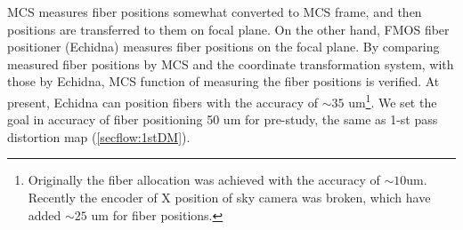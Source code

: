 MCS measures fiber positions somewhat converted to MCS frame, and then positions are transferred to them on focal plane.
On the other hand, FMOS fiber positioner (Echidna) measures fiber positions on the focal plane.
By comparing measured fiber positions by MCS and the coordinate transformation system, with those by Echidna, MCS function of measuring the fiber positions is verified.
At present, Echidna can position fibers with the accuracy of $\sim 35$ um\footnote{Originally the fiber allocation was achieved with the accuracy of $\sim 10$um. Recently the encoder of X position of sky camera was broken, which have added $\sim 25$ um for fiber positions.}.
We set the goal in accuracy of fiber positioning 50 um for pre-study, the same as 1-st pass distortion map (\ref{secflow:1stDM}).

